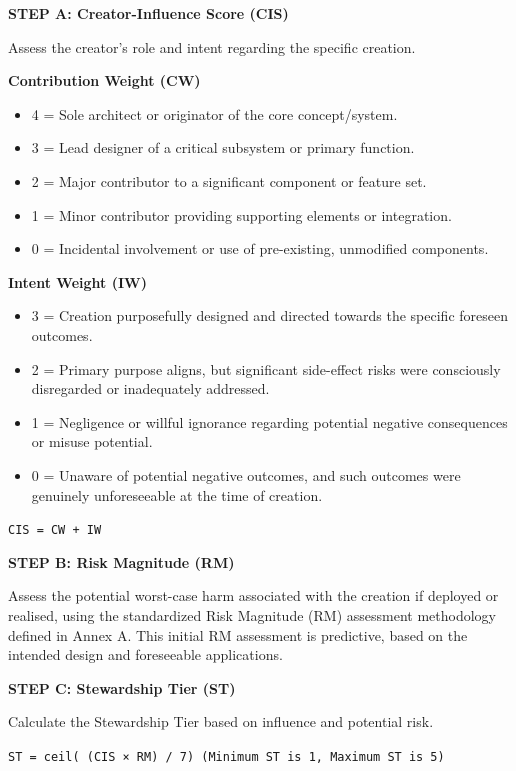 \documentclass[11pt]{article}
\begin{document}
\textbf{STEP A: Creator-Influence Score (CIS)}

Assess the creator's role and intent regarding the specific creation.


\textbf{Contribution Weight (CW)}

\begin{itemize}\setlength\itemsep{0pt}
\item 4 = Sole architect or originator of the core concept/system.
\item 3 = Lead designer of a critical subsystem or primary function.
\item 2 = Major contributor to a significant component or feature set.
\item 1 = Minor contributor providing supporting elements or integration.
\item 0 = Incidental involvement or use of pre-existing, unmodified components.
\end{itemize}


\textbf{Intent Weight (IW)}

\begin{itemize}\setlength\itemsep{0pt}
\item 3 = Creation purposefully designed and directed towards the specific foreseen outcomes.
\item 2 = Primary purpose aligns, but significant side-effect risks were consciously disregarded or inadequately addressed.
\item 1 = Negligence or willful ignorance regarding potential negative consequences or misuse potential.
\item 0 = Unaware of potential negative outcomes, and such outcomes were genuinely unforeseeable at the time of creation.
\end{itemize}


\texttt{CIS = CW + IW}


\textbf{STEP B: Risk Magnitude (RM)}

Assess the potential worst-case harm associated with the creation if deployed or realised, using the standardized Risk Magnitude (RM) assessment methodology defined in Annex A. This initial RM assessment is predictive, based on the intended design and foreseeable applications.


\textbf{STEP C: Stewardship Tier (ST)}

Calculate the Stewardship Tier based on influence and potential risk.


\texttt{ST = ceil( (CIS × RM) / 7) (Minimum ST is 1, Maximum ST is 5)}
\end{document}
